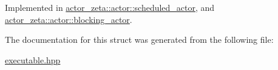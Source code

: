 Implemented in \hyperlink{classactor__zeta_1_1actor_1_1scheduled__actor_a9031c2f3ff6c8c62698b53fa92e56274}{actor\+\_\+zeta\+::actor\+::scheduled\+\_\+actor}, and \hyperlink{classactor__zeta_1_1actor_1_1blocking__actor_af92ae4139344b002f8014433f64f8e56}{actor\+\_\+zeta\+::actor\+::blocking\+\_\+actor}.



The documentation for this struct was generated from the following file\+:\begin{DoxyCompactItemize}
\item 
\hyperlink{executable_8hpp}{executable.\+hpp}\end{DoxyCompactItemize}
